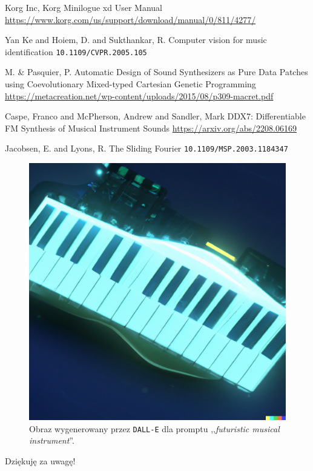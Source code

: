 \documentclass[]{beamer}
\begin{document}
\begin{frame}
  \begin{thebibliography}{99} %
   Korg Inc,
  \newblock Korg Minilogue xd User Manual
  \newblock \url{https://www.korg.com/us/support/download/manual/0/811/4277/}

   Yan Ke and Hoiem, D. and Sukthankar, R.
  \newblock Computer vision for music identification
  \newblock \texttt{10.1109/CVPR.2005.105}

   M. & Pasquier, P.
  \newblock Automatic Design of Sound Synthesizers as Pure Data Patches using Coevolutionary Mixed-typed Cartesian Genetic Programming
  \newblock \url{https://metacreation.net/wp-content/uploads/2015/08/p309-macret.pdf}

  \end{thebibliography}
\end{frame}

\begin{frame}
  \begin{thebibliography}{99} %

     Caspe, Franco and McPherson, Andrew and Sandler, Mark
    \newblock DDX7: Differentiable FM Synthesis of Musical Instrument Sounds
    \newblock \url{https://arxiv.org/abs/2208.06169}

     Jacobsen, E. and Lyons, R.
    \newblock The Sliding Fourier
    \newblock \texttt{10.1109/MSP.2003.1184347}

  \end{thebibliography}
\end{frame}

\begin{frame}

  \vspace{-0.5cm}
  \begin{figure}
    \includegraphics[width=0.4\linewidth]{ending.png}
    \caption{Obraz wygenerowany przez \texttt{DALL-E} dla promptu ,,\textit{futuristic musical instrument}''.}
  \end{figure}

  \centering
  \Large
  Dziękuję za uwagę!
\end{frame}
\end{document}
